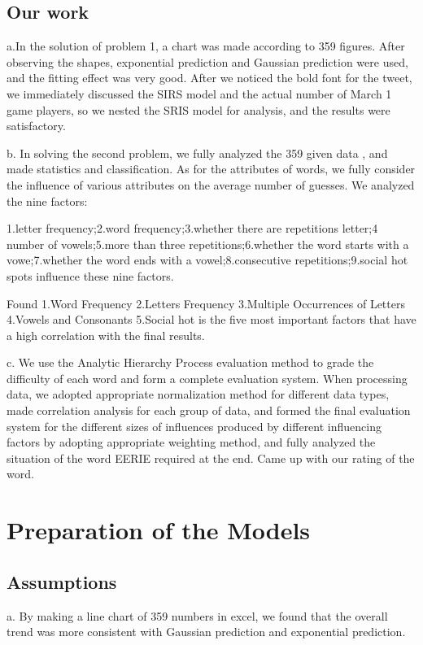 \documentclass[12pt]{article}  %
\begin{document}
\subsection{Our work}


a.In the solution of problem 1, a chart was made according to 359 figures. After observing the shapes, exponential prediction and Gaussian prediction were used, and the fitting effect was very good. After we noticed the bold font for the tweet, we immediately discussed the SIRS model and the actual number of March 1 game players, so we nested the SRIS model for analysis, and the results were satisfactory.
    
    
b. In solving the second problem, we fully analyzed the 359 given data , and made statistics and classification. As for the attributes of words, we fully consider the influence of various attributes on the average number of guesses. We analyzed the nine factors: 


1.letter frequency;2.word frequency;3.whether there are repetitions letter;4 number of vowels;5.more than three repetitions;6.whether the word starts with a vowe;7.whether the word ends with a vowel;8.consecutive repetitions;9.social hot spots influence these nine factors. 


Found 1.Word Frequency 2.Letters Frequency 3.Multiple Occurrences of Letters 4.Vowels and Consonants 5.Social hot is the five most important factors that have a high correlation with the final results.
    
    
 c. We use the Analytic Hierarchy Process evaluation method to grade the difficulty of each word and form a complete evaluation system. When processing data, we adopted appropriate normalization method for different data types, made correlation analysis for each group of data, and formed the final evaluation system for the different sizes of influences produced by different influencing factors by adopting appropriate weighting method, and fully analyzed the situation of the word EERIE required at the end. Came up with our rating of the word.



\section{Preparation of the Models}
\subsection{Assumptions}
a. By making a line chart of 359 numbers in excel, we found that the overall trend was more consistent with Gaussian prediction and exponential prediction.
\end{document}
